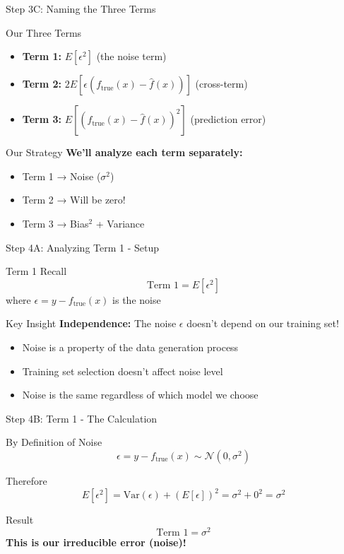 \documentclass[10pt]{beamer}
\begin{document}
\begin{frame}{Step 3C: Naming the Three Terms}
\begin{definitionbox}{Our Three Terms}
\begin{itemize}
\item \textbf{Term 1:} $E[\epsilon^2]$ (the noise term)
\item \textbf{Term 2:} $2E[\epsilon(f_{\text{true}}(x) - \hat{f}(x))]$ (cross-term)
\item \textbf{Term 3:} $E[(f_{\text{true}}(x) - \hat{f}(x))^2]$ (prediction error)
\end{itemize}
\end{definitionbox}

\begin{keypointsbox}{Our Strategy}
\textbf{We'll analyze each term separately:}
\begin{itemize}
\item Term 1 → Noise ($\sigma^2$)
\item Term 2 → Will be zero! 
\item Term 3 → Bias$^2$ + Variance
\end{itemize}
\end{keypointsbox}
\end{frame}

\begin{frame}{Step 4A: Analyzing Term 1 - Setup}
\begin{definitionbox}{Term 1 Recall}
$$\text{Term 1} = E[\epsilon^2]$$
where $\epsilon = y - f_{\text{true}}(x)$ is the noise
\end{definitionbox}

\begin{keypointsbox}{Key Insight}
\textbf{Independence:} The noise $\epsilon$ doesn't depend on our training set!
\begin{itemize}
\item Noise is a property of the data generation process
\item Training set selection doesn't affect noise level
\item Noise is the same regardless of which model we choose
\end{itemize}
\end{keypointsbox}
\end{frame}

\begin{frame}{Step 4B: Term 1 - The Calculation}
\begin{examplebox}{By Definition of Noise}
$$\epsilon = y - f_{\text{true}}(x) \sim \mathcal{N}(0, \sigma^2)$$
\end{examplebox}

\begin{keypointsbox}{Therefore}
$$E[\epsilon^2] = \text{Var}(\epsilon) + (E[\epsilon])^2 = \sigma^2 + 0^2 = \sigma^2$$
\end{keypointsbox}

\begin{alertbox}{Result}
$$\boxed{\text{Term 1} = \sigma^2}$$
\textbf{This is our irreducible error (noise)!}
\end{alertbox}
\end{frame}
\end{document}
